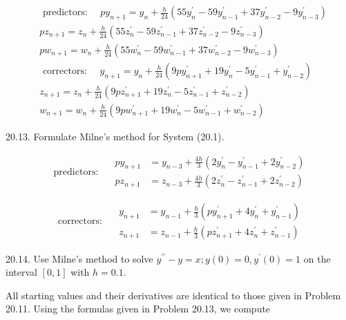 \documentclass[10pt]{article}
\begin{document}
$$
\begin{aligned}
& \text { predictors: } \quad p y_{n+1}=y_{n}+\frac{h}{24}\left(55 y_{n}^{\prime}-59 y_{n-1}^{\prime}+37 y_{n-2}^{\prime}-9 y_{n-3}^{\prime}\right) \\
& p z_{n+1}=z_{n}+\frac{h}{24}\left(55 z_{n}^{\prime}-59 z_{n-1}^{\prime}+37 z_{n-2}^{\prime}-9 z_{n-3}^{\prime}\right) \\
& p w_{n+1}=w_{n}+\frac{h}{24}\left(55 w_{n}^{\prime}-59 w_{n-1}^{\prime}+37 w_{n-2}^{\prime}-9 w_{n-3}^{\prime}\right) \\
& \text { correctors: } \quad y_{n+1}=y_{n}+\frac{h}{24}\left(9 p y_{n+1}^{\prime}+19 y_{n}^{\prime}-5 y_{n-1}^{\prime}+y_{n-2}^{\prime}\right) \\
& z_{n+1}=z_{n}+\frac{h}{24}\left(9 p z_{n+1}^{\prime}+19 z_{n}^{\prime}-5 z_{n-1}^{\prime}+z_{n-2}^{\prime}\right) \\
& w_{n+1}=w_{n}+\frac{h}{24}\left(9 p w_{n+1}^{\prime}+19 w_{n}^{\prime}-5 w_{n-1}^{\prime}+w_{n-2}^{\prime}\right)
\end{aligned}
$$

20.13. Formulate Milne's method for System (20.1).

$$
\text { predictors: } \quad \begin{aligned}
p y_{n+1} & =y_{n-3}+\frac{4 h}{3}\left(2 y_{n}^{\prime}-y_{n-1}^{\prime}+2 y_{n-2}^{\prime}\right) \\
p z_{n+1} & =z_{n-3}+\frac{4 h}{3}\left(2 z_{n}^{\prime}-z_{n-1}^{\prime}+2 z_{n-2}^{\prime}\right)
\end{aligned}
$$

$$
\text { correctors: } \quad \begin{aligned}
y_{n+1} & =y_{n-1}+\frac{h}{3}\left(p y_{n+1}^{\prime}+4 y_{n}^{\prime}+y_{n-1}^{\prime}\right) \\
z_{n+1} & =z_{n-1}+\frac{h}{3}\left(p z_{n+1}^{\prime}+4 z_{n}^{\prime}+z_{n-1}^{\prime}\right)
\end{aligned}
$$

20.14. Use Milne's method to solve $y^{\prime \prime}-y=x ; y(0)=0, y^{\prime}(0)=1$ on the interval $[0,1]$ with $h=0.1$.

All starting values and their derivatives are identical to those given in Problem 20.11. Using the formulas given in Problem 20.13, we compute
\end{document}
